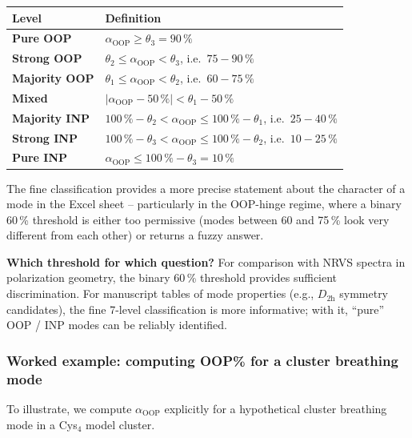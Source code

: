 \documentclass[11pt,a4paper,twoside]{article}
\newcommand{\OOP}{\mathrm{OOP}}
\theoremstyle{remark}
\begin{document}
\begin{center}
\begin{tabularx}{\textwidth}{l X}
\toprule
\textbf{Level} & \textbf{Definition} \\
\midrule
\textbf{Pure OOP}        & $\alpha_{\OOP} \geq \theta_3 = 90\,\%$ \\
\textbf{Strong OOP}      & $\theta_2 \leq \alpha_{\OOP} < \theta_3$, i.e.\ $75-90\,\%$ \\
\textbf{Majority OOP}    & $\theta_1 \leq \alpha_{\OOP} < \theta_2$, i.e.\ $60-75\,\%$ \\
\textbf{Mixed}           & $|{\alpha_{\OOP} - 50\,\%}| < \theta_1 - 50\,\%$ \\
\textbf{Majority INP}    & $100\,\% - \theta_2 < \alpha_{\OOP} \leq 100\,\% - \theta_1$, i.e.\ $25-40\,\%$ \\
\textbf{Strong INP}      & $100\,\% - \theta_3 < \alpha_{\OOP} \leq 100\,\% - \theta_2$, i.e.\ $10-25\,\%$ \\
\textbf{Pure INP}        & $\alpha_{\OOP} \leq 100\,\% - \theta_3 = 10\,\%$ \\
\bottomrule
\end{tabularx}
\end{center}

The fine classification provides a more precise statement about the
character of a mode in the Excel sheet -- particularly in the
OOP-hinge regime, where a binary 60\,\% threshold is either too
permissive (modes between 60 and 75\,\% look very different from
each other) or returns a fuzzy answer.

\begin{infobox}
\textbf{Which threshold for which question?} For comparison with
NRVS spectra in polarization geometry, the binary 60\,\% threshold
provides sufficient discrimination. For manuscript tables of
mode properties (e.g., $D_\mathrm{2h}$ symmetry candidates), the
fine 7-level classification is more informative; with it, ``pure''
OOP / INP modes can be reliably identified.
\end{infobox}

\subsubsection*{Worked example: computing OOP\% for a cluster breathing mode}

To illustrate, we compute $\alpha_{\OOP}$ explicitly for a
hypothetical cluster breathing mode in a Cys$_4$ model cluster.
\end{document}
